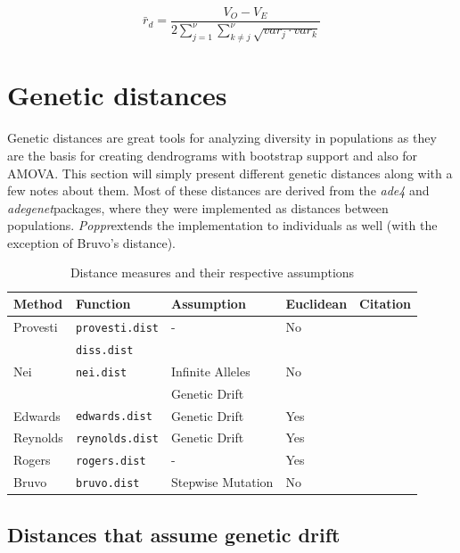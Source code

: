 \documentclass[letterpaper]{article}\usepackage[]{graphicx}\usepackage[]{color}
\newcommand{\Poppr}{\textit{Poppr}}
\newcommand{\adegenet}{\textit{adegenet}}
\begin{document}
\begin{equation}
\label{eq:r_d}
\bar{r}_d = \frac{V_O - V_E}
{2\displaystyle \sum_{j=1}^{\nu}\displaystyle \sum_{k \neq j}^{\nu}\sqrt{var_j\cdot{}var_k}}
\end{equation}

\section{Genetic distances}

Genetic distances are great tools for analyzing diversity in
populations as they are the basis for creating dendrograms with bootstrap
support and also for AMOVA. This section will simply present different genetic
distances along with a few notes about them. Most of these distances are derived
from the \textit{ade4} and \adegenet packages, where they were implemented as
distances between populations. \Poppr extends the implementation to individuals
as well (with the exception of Bruvo's distance).

\begin{table}[ht]
\centering
\caption{Distance measures and their respective assumptions}
\begin{tabular}{lllll}
  \hline
 Method & Function & Assumption & Euclidean & Citation\\ 
  \hline
Provesti & \texttt{provesti.dist} & - & No & \cite{prevosti1975distances}\\
 & \texttt{diss.dist} & & & \\
Nei & \texttt{nei.dist} & Infinite Alleles & No & \cite{nei1972genetic, nei1978estimation}\\
 & & Genetic Drift & & \\
Edwards & \texttt{edwards.dist} & Genetic Drift & Yes & \cite{edwards1971distances}\\
Reynolds & \texttt{reynolds.dist} & Genetic Drift & Yes & \cite{reynolds1983estimation}\\
Rogers & \texttt{rogers.dist} & - & Yes & \cite{rogers1972measures}\\
Bruvo & \texttt{bruvo.dist} & Stepwise Mutation & No & \cite{Bruvo:2004}\\
   \hline
\end{tabular}
\end{table}

\subsection{Distances that assume genetic drift}
\end{document}
